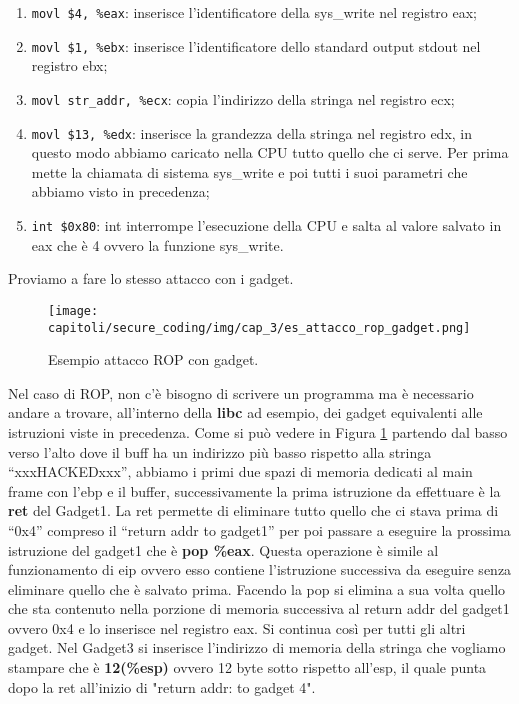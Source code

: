 \begin{enumerate}
    \item \verb|movl $4, %eax|: inserisce
          l'identificatore della sys\_write nel registro eax;
    \item \verb|movl $1, %ebx|: inserisce l'identificatore
          dello standard output stdout nel registro ebx;
    \item \verb|movl str_addr, %ecx|: copia l'indirizzo della stringa nel registro ecx;
    \item \verb|movl $13, %edx|: inserisce la grandezza della
          stringa nel registro edx, in questo modo abbiamo caricato nella
          CPU tutto quello che ci serve. Per prima mette la chiamata di
          sistema sys\_write e poi tutti i suoi parametri che abbiamo visto in
          precedenza;
    \item \verb|int $0x80|: int interrompe l'esecuzione della CPU e salta al
          valore salvato in eax che è 4 ovvero la funzione sys\_write.
\end{enumerate}

Proviamo a fare lo stesso attacco con i gadget.

\begin{figure}[H]
    \centering
    \texttt{[image: capitoli/secure\_coding/img/cap\_3/es\_attacco\_rop\_gadget.png]}
    \caption{Esempio attacco ROP con gadget.}\label{fig:es_attacco_rop_gadget}
\end{figure}

Nel caso di ROP, non c'è bisogno di scrivere un programma ma è necessario andare a
trovare, all'interno della \textbf{libc} ad esempio, dei gadget equivalenti alle
istruzioni viste in precedenza.
Come si può vedere in Figura \ref{fig:es_attacco_rop_gadget} partendo dal basso verso
l'alto dove il buff ha un indirizzo più basso rispetto
alla stringa ``xxxHACKEDxxx'', abbiamo i primi due spazi di memoria dedicati al main
frame con l'ebp e il buffer,
successivamente la prima istruzione da effettuare è la \textbf{ret} del Gadget1.
La ret permette di eliminare tutto quello che ci stava prima di ``0x4'' compreso il
``return addr to gadget1'' per poi passare a eseguire la prossima
istruzione del gadget1 che è \textbf{pop \%eax}.
Questa operazione è simile al funzionamento di eip ovvero esso contiene l'istruzione
successiva da eseguire senza eliminare quello che è salvato prima.
Facendo la pop si elimina a sua volta quello che sta contenuto nella porzione di
memoria successiva al return addr del gadget1 ovvero 0x4 e lo
inserisce nel registro eax. Si continua così per tutti gli altri gadget.
Nel Gadget3 si inserisce l'indirizzo di memoria della stringa che vogliamo stampare
che è \textbf{12(\%esp)}
ovvero 12 byte sotto rispetto all'esp, il quale punta dopo la ret all'inizio
di "return addr: to gadget 4".


